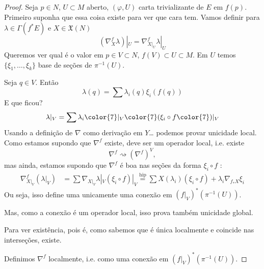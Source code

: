 \begin{proof}\leavevmode
Seja \(p \in N\), \(U \subset M\) aberto, \((\varphi,U)\) carta trivializante de \(E\) em \(f(p)\). Primeiro suponha que essa coisa existe para ver que cara tem. Vamos definir para \(\lambda \in \Gamma(f^*E)\) e \(X \in \mathfrak{X}(N)\)
\[(\nabla_X^f \lambda)|_{U}=\nabla_{X|_{U}}^f \lambda|_{U}\]
Queremos ver qual é o valor em \(p \in V \subset N\), \(f(V) \subset U \subset M\). Em \(U\) temos \(\{\xi_1,\ldots,\xi_k\}\) base de seções de \(\pi^{-1}(U)\).

Seja \(q \in V\). Então
\[\lambda(q)=\sum\lambda_i(q) \xi_i(f(q))\]
E que ficou?
\[\lambda|_{V}=\sum\lambda_i{\color{7}|_{V}} {\color{7}(}\xi_i \circ f{\color{7})|_{V}}\]
Usando a definição de \(\nabla\) como derivação em \(Y\)… podemos provar unicidade local. {\color{2}Como estamos supondo que \(\nabla^f\) existe, deve ser um operador local, i.e. existe} 
\[\nabla^f \rightsquigarrow  (\nabla^f)^V,\]
{\color{2}mas ainda, estamos supondo que \(\nabla^f\) é boa nas seções da forma \(\xi_i \circ f\) }:
\begin{align*}
\nabla_{X|_{V}}^f(\lambda|_{V})&=\sum\nabla_{X|_{V}}\lambda|_{V}(\xi_i \circ f)|_{V}\overset{\operatorname{hip}}{=}\sum X(\lambda_i)(\xi_i \circ f)+\lambda_i\nabla_{f_*X}\xi_i
\end{align*}
Ou seja, isso define uma unicamente uma conexão em \((f|_{V})^*(\pi^{-1}(U))\).

Mas, como a conexão é um operador local, isso prova também unicidade global. 

Para ver existência, pois é, como sabemos que é única localmente e coincide nas interseções, existe.

Definimos \(\nabla^f\) localmente, i.e. como uma conexão em \((f|_{V})^*(\pi^{-1}(U))\).


\end{proof}
